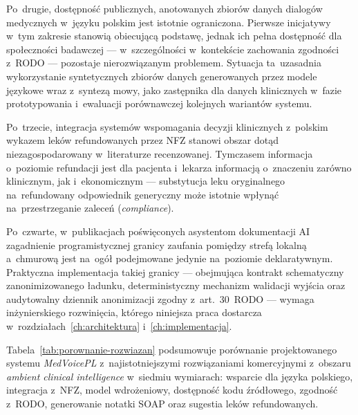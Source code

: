 Po~drugie, dostępność publicznych, anotowanych zbiorów danych
dialogów medycznych w~języku polskim jest istotnie ograniczona.
Pierwsze inicjatywy w~tym zakresie \parencite{polishmedicalspeechdataset,
polishclinicalasr} stanowią obiecującą podstawę, jednak ich pełna
dostępność dla społeczności badawczej --- w~szczególności w~kontekście
zachowania zgodności z~RODO --- pozostaje nierozwiązanym problemem.
Sytuacja ta~uzasadnia wykorzystanie syntetycznych zbiorów danych
generowanych przez modele językowe wraz z~syntezą mowy, jako
zastępnika dla danych klinicznych w~fazie prototypowania i~ewaluacji
porównawczej kolejnych wariantów systemu.

Po~trzecie, integracja systemów wspomagania decyzji klinicznych
z~polskim wykazem leków refundowanych przez NFZ stanowi obszar
dotąd niezagospodarowany w~literaturze recenzowanej. Tymczasem
informacja o~poziomie refundacji jest dla pacjenta i~lekarza
informacją o~znaczeniu zarówno klinicznym, jak i~ekonomicznym ---
substytucja leku oryginalnego na~refundowany odpowiednik generyczny
może istotnie wpłynąć na~przestrzeganie zaleceń (\emph{compliance}).

Po~czwarte, w~publikacjach poświęconych asystentom dokumentacji AI
zagadnienie programistycznej granicy zaufania pomiędzy strefą
lokalną a~chmurową jest na~ogół podejmowane jedynie na~poziomie
deklaratywnym. Praktyczna implementacja takiej granicy --- obejmująca
kontrakt schematyczny zanonimizowanego ładunku, deterministyczny
mechanizm walidacji wyjścia oraz audytowalny dziennik anonimizacji
zgodny z~art.~30~RODO --- wymaga inżynierskiego rozwinięcia,
którego niniejsza praca dostarcza w~rozdziałach~\ref{ch:architektura}
i~\ref{ch:implementacja}.

Tabela~\ref{tab:porownanie-rozwiazan} podsumowuje porównanie
projektowanego systemu \emph{MedVoicePL} z~najistotniejszymi
rozwiązaniami komercyjnymi z~obszaru \emph{ambient clinical
intelligence} w~siedmiu wymiarach: wsparcie dla języka polskiego,
integracja z~NFZ, model wdrożeniowy, dostępność kodu źródłowego,
zgodność z~RODO, generowanie notatki SOAP oraz sugestia leków
refundowanych.

